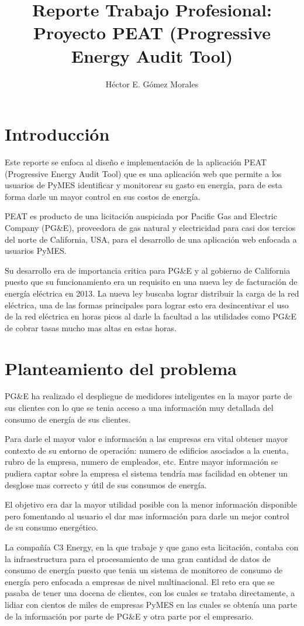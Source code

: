 \documentclass{article}
\author{Héctor E. Gómez Morales}
\title{Reporte Trabajo Profesional: Proyecto PEAT (Progressive Energy
  Audit Tool)}
\begin{document}
\maketitle
\tableofcontents
\section{Introducción}
Este reporte se enfoca al diseño e implementación de la aplicación
PEAT (Progressive Energy Audit Tool) que es una aplicación web que
permite a los usuarios de PyMES identificar y monitorear su gasto en
energía, para de esta forma darle un mayor control en sus costos de
energía.

PEAT es producto de una licitación auspiciada por Pacific Gas and
Electric Company (PG\&E), proveedora de gas natural y electricidad
para casi dos tercios del norte de California, USA, para
el desarrollo de una aplicación web enfocada a usuarios PyMES.

Su desarrollo era de importancia critica para PG\&E y al gobierno de
California puesto que su funcionamiento era un requisito en una nueva
ley de facturación de energía eléctrica en 2013. La nueva ley buscaba
lograr distribuir la carga de la red eléctrica, una de las formas
principales para lograr esto era desincentivar el uso de la red
eléctrica en horas picos al darle la facultad a las utilidades como PG\&E
de cobrar tasas mucho mas altas en estas horas.

\section{Planteamiento del problema}
PG\&E ha realizado el despliegue de medidores inteligentes en la
mayor parte de sus clientes con lo que se tenia acceso a una información
muy detallada del consumo de energía de sus clientes.

Para darle el mayor valor e información a las empresas era
vital obtener mayor contexto de su entorno de operación: numero
de edificios asociados a la cuenta, rubro de la empresa, numero de
empleados, etc. Entre mayor información se pudiera captar sobre la
empresa el sistema tendría mas facilidad en obtener un desglose
mas correcto y útil de sus consumos de energía.

El objetivo era dar la mayor utilidad posible con la menor
información disponible pero fomentando al usuario el dar mas
información para darle un mejor control de su consumo energético.

La compañía C3 Energy, en la que trabaje y que gano esta licitación,
contaba con la infraestructura para el procesamiento de una gran
cantidad de datos de consumo de energía puesto que tenia un sistema
de monitoreo de consumo de energía pero enfocada a empresas de nivel
multinacional. El reto era que se pasaba de tener una docena
de clientes, con los cuales se trataba directamente, a lidiar con
cientos de miles de empresas PyMES en las cuales se obtenía una
parte de la información por parte de PG\&E y otra parte por el
empresario.
\end{document}
